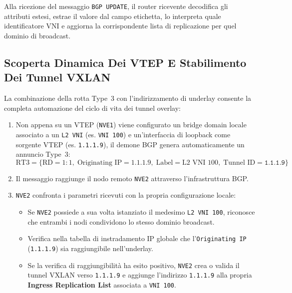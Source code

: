 \documentclass[11pt, a4paper]{article}
\begin{document}
Alla ricezione del messaggio \texttt{BGP UPDATE}, il router ricevente decodifica gli attributi estesi, estrae il valore dal campo etichetta, lo interpreta quale identificatore VNI e aggiorna la corrispondente lista di replicazione per quel dominio di broadcast.

\subsection{Scoperta Dinamica Dei VTEP E Stabilimento Dei Tunnel VXLAN}

La combinazione della rotta Type~3 con l'indirizzamento di underlay consente la completa automazione del ciclo di vita dei tunnel overlay:


\begin{enumerate}
    \item Non appena su un VTEP (\texttt{NVE1}) viene configurato un bridge domain locale associato a un \texttt{L2 VNI} (es. \texttt{VNI 100}) e un'interfaccia di loopback come sorgente VTEP (es. \texttt{1.1.1.9}), il demone BGP genera automaticamente un annuncio Type~3:
    \[
    \text{RT3} = \Big\{ \text{RD}=1:1, \; \text{Originating IP}=1.1.1.9, \; \text{Label}=\text{L2 VNI } 100, \; \text{Tunnel ID}=\texttt{1.1.1.9} \Big\}
    \]
    \item Il messaggio raggiunge il nodo remoto \texttt{NVE2} attraverso l'infrastruttura BGP.
    \item \texttt{NVE2} confronta i parametri ricevuti con la propria configurazione locale:
    \begin{itemize}[noitemsep]
        \item Se \texttt{NVE2} possiede a sua volta istanziato il medesimo \texttt{L2 VNI 100}, riconosce che entrambi i nodi condividono lo stesso dominio broadcast.
        \item Verifica nella tabella di instradamento IP globale che l'\texttt{Originating IP} (\texttt{1.1.1.9}) sia raggiungibile nell'underlay.
        \item Se la verifica di raggiungibilità ha esito positivo, \texttt{NVE2} crea o valida il tunnel VXLAN verso \texttt{1.1.1.9} e aggiunge l'indirizzo \texttt{1.1.1.9} alla propria \textbf{Ingress Replication List} associata a \texttt{VNI 100}.
    \end{itemize}
\end{enumerate}
\end{document}

